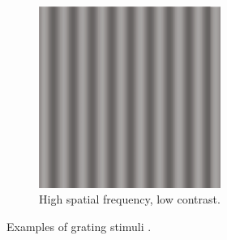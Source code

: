 \begin{figure}[!htp]
\begin{subfigure}[t]{0.3\textwidth}
        \includegraphics[width=0.65\textwidth]{assets/images/grating-stimuli/3.png}
        \caption{High spatial frequency, low contrast.}
    \end{subfigure}
    \caption[Examples of grating stimuli]{Examples of grating stimuli \cite{KandelBook2003:26}.}
    \label{fig:grating-stimuli-examples}
\end{figure}
